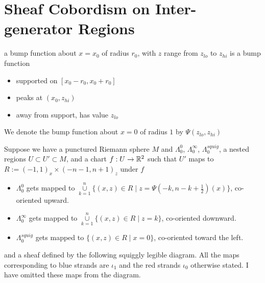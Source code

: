 \section{Sheaf Cobordism on Inter-generator Regions}
\begin{definition}
a bump function about $x=x_0$ of radius $r_0$, with $z$ range from $z_{lo}$ to $z_{hi}$ is a bump function 
\begin{itemize}
\item supported on $[x_0 - r_0,x_0 + r_0]$
\item peaks at $(x_0,z_{hi})$
\item away from support, has value $z_{lo}$
\end{itemize}
We denote the bump function about $x=0$ of radius $1$ by $\Psi(z_{lo},z_{hi})$
\end{definition}

Suppose we have a punctured Riemann sphere $M$ and $\Lambda_0^0$, $\Lambda_0^\infty$, $\Lambda_0^{squig}$, a nested regions $U\subset U' \subset M$, and a chart $f : U \rightarrow \mathbb{R}^2$ such that $U'$ maps to $R:=(-1,1)_x \times (-n-1,n+1)_z$ under $f$
\begin{itemize}
\item $\Lambda_0^0$ gets mapped to $\overset{n}{\underset{k=1}{\cup}}\{(x,z)\in R \mid z=\Psi(-k,n-k+\frac{1}{2})(x)\}$, co-oriented upward.

\item $\Lambda_0^\infty$ gets mapped to $\overset{n}{\underset{k=1}{\cup}}\{(x,z)\in R \mid z=k\}$, co-oriented downward.

\item $\Lambda_0^{squig}$ gets mapped to $\{(x,z)\in R \mid x=0\}$, co-oriented toward the left.
\end{itemize}
and a sheaf defined by the following squiggly legible diagram. All the maps corresponding to blue strands are $\iota_1$ and the red strands $\iota_0$ otherwise stated. I have omitted these maps from the diagram.\\


